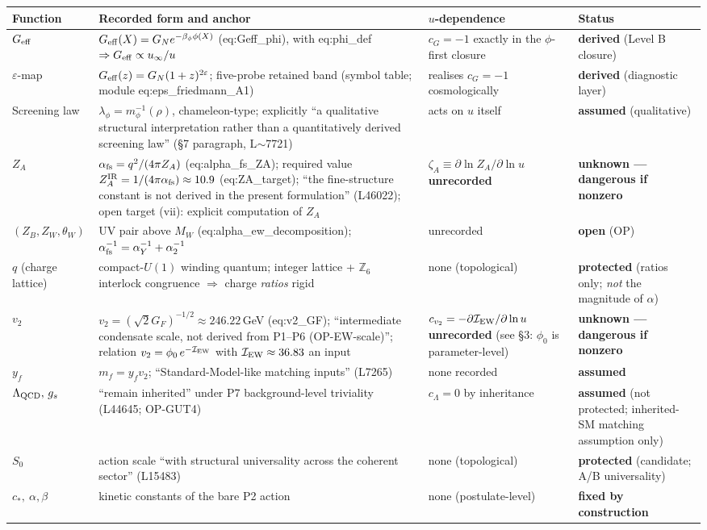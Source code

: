 \documentclass[11pt,a4paper]{article}
\begin{document}
\renewcommand{\arraystretch}{1.18}\small
\begin{longtable}{@{}p{2.6cm}p{6.2cm}p{2.9cm}p{2.8cm}@{}}
\toprule \textbf{Function} & \textbf{Recorded form and anchor} &
\textbf{$u$-dependence} & \textbf{Status} \\ \midrule \endhead
\bottomrule \endfoot
$G_{\rm eff}$ & $G_{\rm eff}(X)=G_N e^{-\beta_\phi\phi(X)}$ (eq:Geff\_phi), with
eq:phi\_def $\Rightarrow G_{\rm eff}\propto u_\infty/u$ & $c_G=-1$ exactly in the
$\phi$-first closure & \textbf{derived} (Level B closure) \\
$\varepsilon$-map & $G_{\rm eff}(z)=G_N(1+z)^{2\varepsilon}$; five-probe retained
band (symbol table; module eq:eps\_friedmann\_A1) & realises $c_G=-1$
cosmologically & \textbf{derived} (diagnostic layer) \\
Screening law & $\lambda_\phi=m_\phi^{-1}(\rho)$, chameleon-type; explicitly ``a
qualitative structural interpretation rather than a quantitatively derived
screening law'' (\S7 paragraph, L$\sim$7721) & acts on $u$ itself & \textbf{assumed}
(qualitative) \\
$Z_A$ & $\alpha_{\rm fs}=q^2/(4\pi Z_A)$ (eq:alpha\_fs\_ZA); required value
$Z_A^{\rm IR}=1/(4\pi\alpha_{\rm fs})\approx10.9$ (eq:ZA\_target); ``the
fine-structure constant is not derived in the present formulation'' (L46022); open
target (vii): explicit computation of $Z_A$ & $\zeta_A\equiv\partial\ln
Z_A/\partial\ln u$ \textbf{unrecorded} & \textbf{unknown ---
dangerous if nonzero} \\
$(Z_B,Z_W,\theta_W)$ & UV pair above $M_W$ (eq:alpha\_ew\_decomposition);
$\alpha_{\rm fs}^{-1}=\alpha_Y^{-1}+\alpha_2^{-1}$ & unrecorded & \textbf{open}
(OP) \\
$q$ (charge lattice) & compact-$U(1)$ winding quantum; integer lattice +
$\mathbb{Z}_6$ interlock congruence $\Rightarrow$ charge \emph{ratios} rigid &
none (topological) & \textbf{protected} (ratios only; \emph{not} the magnitude of
$\alpha$) \\
$v_2$ & $v_2=(\sqrt2 G_F)^{-1/2}\approx246.22$\,GeV (eq:v2\_GF); ``intermediate
condensate scale, not derived from P1--P6 (OP-EW-scale)''; relation
$v_2=\phi_0\,e^{-\mathcal I_{\rm EW}}$ with $\mathcal I_{\rm EW}\approx36.83$ an
input & $c_{v_2}=-\partial\mathcal I_{\rm EW}/\partial\ln u$ \textbf{unrecorded}
(see \S3: $\phi_0$ is parameter-level) & \textbf{unknown --- dangerous if nonzero}
\\
$y_f$ & $m_f=y_f v_2$; ``Standard-Model-like matching inputs'' (L7265) & none
recorded & \textbf{assumed} \\
$\Lambda_{\rm QCD},\,g_s$ & ``remain inherited'' under P7 background-level
triviality (L44645; OP-GUT4) & $c_\Lambda=0$ by inheritance & \textbf{assumed}
(not protected; inherited-SM matching assumption only) \\
$S_0$ & action scale ``with structural universality across the coherent sector''
(L15483) & none (topological) & \textbf{protected} (candidate; A/B universality) \\
$c_*,\ \alpha,\beta$ & kinetic constants of the bare P2 action & none
(postulate-level) & \textbf{fixed by construction} \\
\end{longtable}\normalsize
\end{document}

